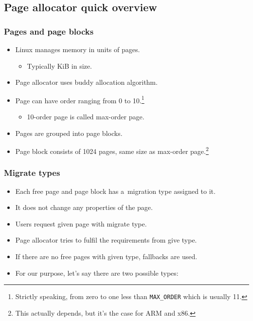 
\subsection{Page allocator quick overview}

\begin{frame}[fragile]
  \frametitle{Pages and page blocks}

  \begin{itemize}
  \item Linux manages memory in units of pages.
    \begin{itemize}
    \item Typically \unit[4]{KiB} in size.
    \end{itemize}
  \item Page allocator uses buddy allocation algorithm.
  \item Page can have order ranging from 0 to 10.\footnote{Strictly
    speaking, from zero to one less than \lstinline|MAX_ORDER| which is
    usually 11.}
    \begin{itemize}
    \item 10-order page is called max-order page.
    \end{itemize}
  \item Pages are grouped into page blocks.
  \item Page block consists of 1024 pages, same size as max-order
    page.\footnote{This actually depends, but it's the case for ARM
      and x86.}
  \end{itemize}
\end{frame}

\begin{frame}[fragile]
  \frametitle{Migrate types}

  \begin{itemize}
  \item Each free page and page block has a~migration type assigned to
    it.
  \item It does not change any properties of the page.
  \item Users request given page with migrate type.
  \item Page allocator tries to fulfil the requirements from give
    type.
  \item If there are no free pages with given type, fallbacks are used.
  \item For our purpose, let's say there are two possible types:
  \end{itemize}
\end{frame}
